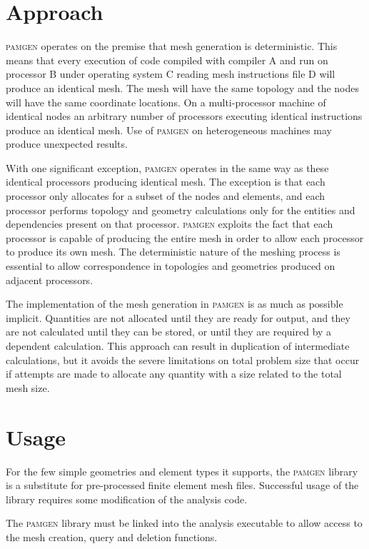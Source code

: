 \clearpage
\section{Approach}\label{sec:challenge}
\textsc{pamgen} operates on the premise that mesh generation is deterministic. This means that every execution of code compiled with compiler A and run on processor B under operating system C reading mesh instructions file D will produce an identical mesh. The mesh will have the same topology and the nodes will have the same coordinate locations.  On a multi-processor machine of identical nodes an arbitrary number of processors executing identical instructions produce an identical mesh. Use of \textsc{pamgen} on heterogeneous machines may produce unexpected results.

With one significant exception, \textsc{pamgen} operates in the same way as these identical processors producing identical mesh. The exception is that each processor only allocates for a subset of the nodes and elements, and each processor performs topology and geometry calculations only for the entities and dependencies present on that processor.  \textsc{pamgen} exploits the fact that each processor is capable of producing the entire mesh in order to allow each processor to produce its own mesh. The deterministic nature of the meshing process is essential to allow correspondence in topologies and geometries produced on adjacent processors.

The implementation of the mesh generation in \textsc{pamgen} is as much as possible implicit. Quantities are not allocated until they are ready for output, and they are not calculated until they can be stored, or until they are required by a dependent calculation. This approach can result in duplication of intermediate calculations, but it avoids the severe limitations on total problem size that occur if attempts are made to allocate any quantity with a size related to the total mesh size.

\clearpage
\section{Usage}\label{sec:usage}
For the few simple geometries and element types it supports, the \textsc{pamgen} library is a substitute for pre-processed finite element mesh files.  Successful usage of the library requires some modification of the analysis code.

The \textsc{pamgen} library must be linked into the analysis executable to allow access to the mesh creation, query and deletion functions.

